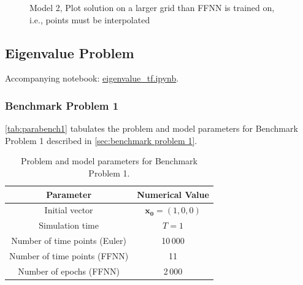 \begin{figure}[H]
\caption{Model 2, Plot solution on a larger grid than FFNN is trained on, i.e., points must be interpolated}
\label{fig:heat_nn4}
\end{figure}


\subsection{Eigenvalue Problem}\label{sec:eigenvalue results}

Accompanying notebook: \href{https://github.com/nicolossus/FYS-STK4155-Project3/blob/master/notebooks/eigenvalue_tf.ipynb}{eigenvalue\_tf.ipynb}.

\subsubsection{Benchmark Problem 1}

\autoref{tab:parabench1} tabulates the problem and model parameters for Benchmark Problem 1 described in \autoref{sec:benchmark problem 1}. 

\begin{table}[H]
\caption{Problem and model parameters for Benchmark Problem 1.}
\centering
{}
\begin{tabular}{c|c}
\hline
\hline 
Parameter & Numerical Value
\\
\hline 
\hline 
Initial vector & $\bm{x_0}=(1,0,0)$
\\
Simulation time & $T=1$
\\
Number of time points (Euler) & 10\,000
\\
Number of time points (FFNN) & 11
\\
Number of epochs (FFNN) & 2\,000
\\
\hline
\hline 
\end{tabular}
\label{tab:parabench1}
\end{table}


